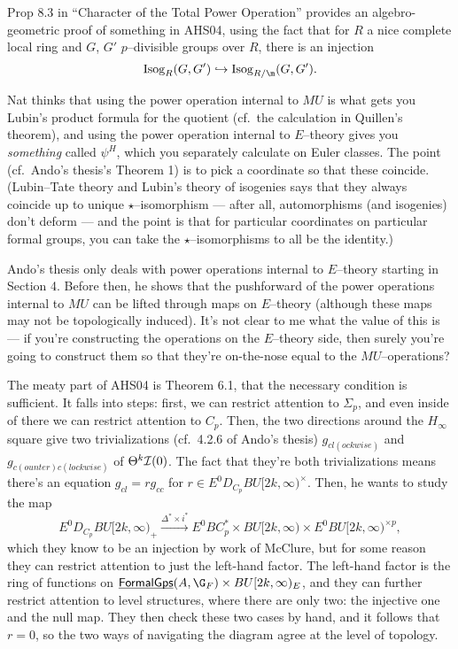 Prop 8.3 in ``Character of the Total Power Operation'' provides an algebro-geometric proof of something in AHS04, using the fact that for $R$ a nice complete local ring and $G$, $G'$ $p$--divisible groups over $R$, there is an injection \[\Isog_R(G, G') \into \Isog_{R/\m}(G, G').\]

Nat thinks that using the power operation internal to $MU$ is what gets you Lubin's product formula for the quotient (cf.\ the calculation in Quillen's theorem), and using the power operation internal to $E$--theory gives you \emph{something} called $\psi^H$, which you separately calculate on Euler classes.  The point (cf.\ Ando's thesis's Theorem 1) is to pick a coordinate so that these coincide.  (Lubin--Tate theory and Lubin's theory of isogenies says that they always coincide up to unique $\star$--isomorphism --- after all, automorphisms (and isogenies) don't deform --- and the point is that for particular coordinates on particular formal groups, you can take the $\star$--isomorphisms to all be the identity.)

Ando's thesis only deals with power operations internal to $E$--theory starting in Section 4.  Before then, he shows that the pushforward of the power operations internal to $MU$ can be lifted through maps on $E$--theory (although these maps may not be topologically induced).  It's not clear to me what the value of this is --- if you're constructing the operations on the $E$--theory side, then surely you're going to construct them so that they're on-the-nose equal to the $MU$--operations?

The meaty part of AHS04 is Theorem 6.1, that the necessary condition is sufficient.  It falls into steps: first, we can restrict attention to $\Sigma_p$, and even inside of there we can restrict attention to $C_p$.  Then, the two directions around the $H_\infty$ square give two trivializations (cf.\ 4.2.6 of Ando's thesis) $g_{cl(ockwise)}$ and $g_{c(ounter)c(lockwise)}$ of $\Theta^k \mathcal{I}(0)$.  The fact that they're both trivializations means there's an equation $g_{cl} = r g_{cc}$ for $r \in E^0 D_{C_p} BU[2k, \infty)^\times$.  Then, he wants to study the map \[E^0 D_{C_p} BU[2k, \infty)_+ \xrightarrow{\Delta^* \times i^*} E^0 BC_p^* \times BU[2k, \infty) \times E^0 BU[2k, \infty)^{\times p},\] which they know to be an injection by work of McClure, but for some reason they can restrict attention to just the left-hand factor.  The left-hand factor is the ring of functions on $\InternalHom{FormalGps}(A, \G_F) \times BU[2k, \infty)_E$, and they can further restrict attention to level structures, where there are only two: the injective one and the null map.  They then check these two cases by hand, and it follows that $r = 0$, so the two ways of navigating the diagram agree at the level of topology.

